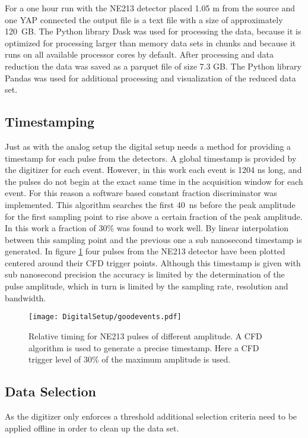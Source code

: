 \documentclass[main.tex]{subfiles}
\begin{document}
For a one hour run with the NE213 detector placed 1.05 m from the source and one YAP connected the output file is a text file with a size of approximately \SI{120}{GB}. The Python library Dask was used for processing the data, because it is optimized for processing larger than memory data sets in chunks and because it runs on all available processor cores by default\cite{Dask}. After processing and data reduction the data was saved as a parquet file of size 7.3 GB. The Python library Pandas was used for additional processing and visualization of the reduced data set\cite{Pandas}.

\subsection{Timestamping}
Just as with the analog setup the digital setup needs a method for providing a timestamp for each pulse from the detectors. A global timestamp is provided by the digitizer for each event. However, in this work each event is 1204 ns long, and the pulses do not begin at the exact same time in the acquisition window for each event. For this reason a software based constant fraction discriminator was implemented. This algorithm searches the first \SI{40}{ns} before the peak amplitude for the first sampling point to rise above  a certain fraction of the peak amplitude. In this work a fraction of 30\% was found to work well. By linear interpolation between this sampling point and the previous one a sub nanosecond timestamp is generated. In figure \ref{fig:cfd_trig} four pulses from the NE213 detector have been plotted centered around their CFD trigger points. Although this timestamp is given with sub nanosecond precision the accuracy is limited by the determination of the pulse amplitude, which in turn is limited by the sampling rate, resolution and bandwidth. 

\begin{figure}[ht!]
    \centering
        \texttt{[image: DigitalSetup/goodevents.pdf]}
        \caption[Examples of digitized pulses and their CFD trigger points]{Relative timing for NE213 pulses of different amplitude. A CFD algorithm is used to generate a precise timestamp. Here a CFD trigger level of 30\% of the maximum amplitude is used.}
    \label{fig:cfd_trig} 
\end{figure}

\subsection{Data Selection}
As the digitizer only enforces a threshold additional selection criteria need to be applied offline in order to clean up the data set. 
\end{document}
